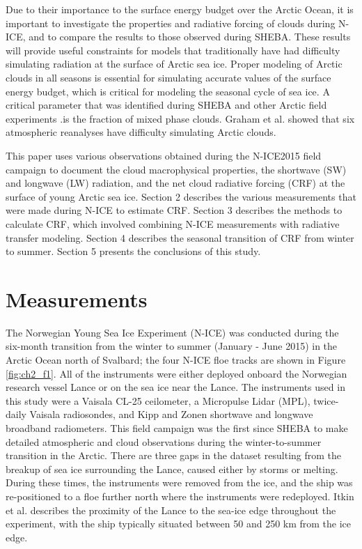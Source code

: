 Due to their importance to the surface energy budget over the Arctic Ocean, it is important to investigate the properties and radiative forcing of clouds during N-ICE, and to compare the results to those observed during SHEBA. These results will provide useful constraints for models that traditionally have had difficulty simulating radiation at the surface of Arctic sea ice. Proper modeling of Arctic clouds in all seasons is essential for simulating accurate values of the surface energy budget, which is critical for modeling the seasonal cycle of sea ice. A critical parameter that was identified during SHEBA \cite{inoue:2006, tjernström:2005} and other Arctic field experiments \cite{hines:2017, listowski:2017, hines:2019}.is the fraction of mixed phase clouds. Graham et al. \cite{graham:2017} showed that six atmospheric reanalyses have difficulty simulating Arctic clouds.

This paper uses various observations obtained during the N-ICE2015 field campaign to document the cloud macrophysical properties, the shortwave (SW) and longwave (LW) radiation, and the net cloud radiative forcing (CRF) at the surface of young Arctic sea ice. Section 2 describes the various measurements that were made during N-ICE to estimate CRF. Section 3 describes the methods to calculate CRF, which involved combining N-ICE measurements with radiative transfer modeling. Section 4 describes the seasonal transition of CRF from winter to summer. Section 5 presents the conclusions of this study.


\section{Measurements}

The Norwegian Young Sea Ice Experiment (N-ICE) was conducted during the six-month transition from the winter to summer (January - June 2015) in the Arctic Ocean north of Svalbard; the four N-ICE floe tracks are shown in Figure \ref{fig:ch2_f1}. All of the instruments were either deployed onboard the Norwegian research vessel Lance or on the sea ice near the Lance. The instruments used in this study were a Vaisala CL-25 ceilometer, a Micropulse Lidar (MPL), twice-daily Vaisala radiosondes, and Kipp and Zonen shortwave and longwave broadband radiometers. This field campaign was the first since SHEBA to make detailed atmospheric and cloud observations during the winter-to-summer transition in the Arctic. There are three gaps in the dataset resulting from the breakup of sea ice surrounding the Lance, caused either by storms or melting. During these times, the instruments were removed from the ice, and the ship was re-positioned to a floe further north where the instruments were redeployed. Itkin et al. \cite{itkin:2017} describes the proximity of the Lance to the sea-ice edge throughout the experiment, with the ship typically situated between 50 and 250 km from the ice edge.

